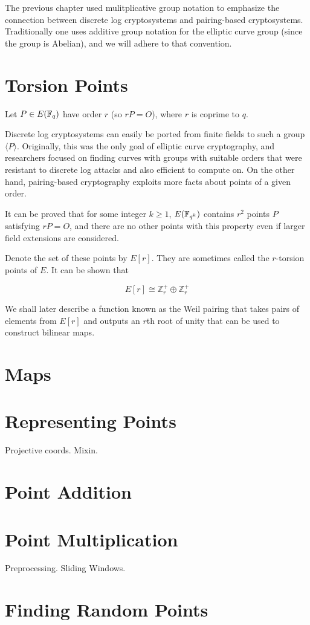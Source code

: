 The previous chapter used mulitplicative group notation to emphasize
the connection
between discrete log cryptosystems and pairing-based cryptosystems.
Traditionally one uses additive group notation for the elliptic curve group
(since the group is Abelian), and we will adhere to that convention.

\section {Torsion Points}

Let $P\in E(\mathbb{F}_q)$ have order $r$ (so $r P = O$),
where $r$ is coprime to $q$.

Discrete log cryptosystems can easily be ported from finite fields
to such a group $\langle P \rangle$.
Originally, this was the only goal of elliptic curve cryptography,
and researchers focused on finding curves with groups with
suitable orders that were resistant to discrete log attacks and also
efficient to compute on.
On the other hand, pairing-based cryptography exploits more facts
about points of a given order.

It can be proved that for some integer $k \ge 1$,
$E(\mathbb{F}_{q^k})$ contains $r^2$ points $P$ satisfying $r P = O$,
and there are no other points with this property even if larger field
extensions are considered.

Denote the set of these points by $E[r]$. They are sometimes called the
$r$-torsion points of $E$. It can be shown that

\[ E[r] \cong \mathbb{Z}_r^+ \oplus \mathbb{Z}_r^+ \]

We shall later describe a function known as the Weil pairing
that takes pairs of elements from $E[r]$ and outputs an $r$th root of unity
that can be used to construct bilinear maps.

\section {Maps}

\section {Representing Points}

Projective coords. Mixin.

\section {Point Addition}

\section {Point Multiplication}

Preprocessing. Sliding Windows.

\section {Finding Random Points}
